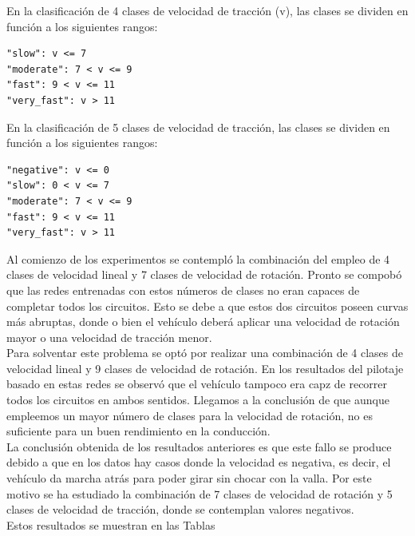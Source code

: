 En la clasificación de 4 clases de velocidad de tracción (v), las clases se dividen en función a los siguientes rangos:

\vspace{10pt}
\begin{lstlisting}
"slow": v <= 7
"moderate": 7 < v <= 9
"fast": 9 < v <= 11
"very_fast": v > 11
\end{lstlisting}
\vspace{20pt}

En la clasificación de 5 clases de velocidad de tracción, las clases se dividen en función a los siguientes rangos:

\vspace{10pt}
\begin{lstlisting}
"negative": v <= 0
"slow": 0 < v <= 7
"moderate": 7 < v <= 9
"fast": 9 < v <= 11
"very_fast": v > 11
\end{lstlisting}
\vspace{20pt}




Al comienzo de los experimentos se contempló la combinación del empleo de 4 clases de velocidad lineal y 7 clases de velocidad de rotación. Pronto se compobó que las redes entrenadas con estos números de clases no eran capaces de completar todos los circuitos. Esto se debe a que estos dos circuitos poseen curvas más abruptas, donde o bien el vehículo deberá aplicar una velocidad de rotación mayor o una velocidad de tracción menor.\\

Para solventar este problema se optó por realizar una combinación de 4 clases de velocidad lineal y 9 clases de velocidad de rotación. En los resultados del pilotaje basado en estas redes se observó que el vehículo tampoco era capz de recorrer todos los circuitos en ambos sentidos. Llegamos a la conclusión de que aunque empleemos un mayor número de clases para la velocidad de rotación, no es suficiente para un buen rendimiento en la conducción.\\

La conclusión obtenida de los resultados anteriores es que este fallo se produce debido a que en los datos hay casos donde la velocidad es negativa, es decir, el vehículo da marcha atrás para poder girar sin chocar con la valla. Por este motivo se ha estudiado la combinación de 7 clases de velocidad de rotación y 5 clases de velocidad de tracción, donde se contemplan valores negativos.\\


Estos resultados se muestran en las Tablas

